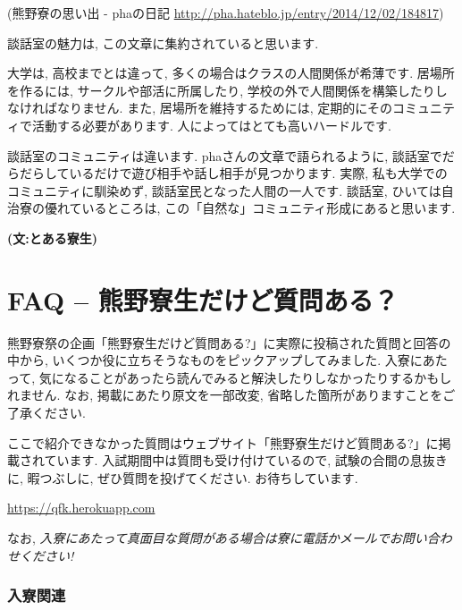 \documentclass[10pt,b5jsbook,dvips,dvipdfmx,openany]{jsbook}
\theoremstyle{definition}
\begin{document}
		(熊野寮の思い出 - phaの日記 \url{http://pha.hateblo.jp/entry/2014/12/02/184817})

		談話室の魅力は, この文章に集約されていると思います.

		大学は, 高校までとは違って, 多くの場合はクラスの人間関係が希薄です. 居場所を作るには, サークルや部活に所属したり, 学校の外で人間関係を構築したりしなければなりません. また, 居場所を維持するためには, 定期的にそのコミュニティで活動する必要があります. 人によってはとても高いハードルです.

		談話室のコミュニティは違います. phaさんの文章で語られるように, 談話室でだらだらしているだけで遊び相手や話し相手が見つかります. 実際, 私も大学でのコミュニティに馴染めず, 談話室民となった人間の一人です. 談話室, ひいては自治寮の優れているところは, この「自然な」コミュニティ形成にあると思います.

{\bf (文:とある寮生)}


\chapter{FAQ -- 熊野寮生だけど質問ある？}
熊野寮祭の企画「熊野寮生だけど質問ある?」に実際に投稿された質問と回答の中から, いくつか役に立ちそうなものをピックアップしてみました. 入寮にあたって, 気になることがあったら読んでみると解決したりしなかったりするかもしれません. なお, 掲載にあたり原文を一部改変, 省略した箇所がありますことをご了承ください.

ここで紹介できなかった質問はウェブサイト「熊野寮生だけど質問ある?」に掲載されています. 入試期間中は質問も受け付けているので, 試験の合間の息抜きに, 暇つぶしに, ぜひ質問を投げてください. お待ちしています.

\url{https://qfk.herokuapp.com}

なお, \emph{入寮にあたって真面目な質問がある場合は寮に電話かメールでお問い合わせください!}

		\subsection{入寮関連}
\end{document}
